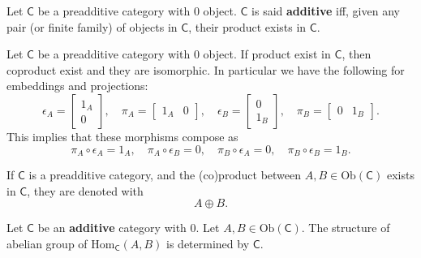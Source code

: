 \begin{defn}
	Let $\mathsf{C}$ be a preadditive category with $0$ object.
	$\mathsf{C}$ is said \textbf{additive} iff, given any pair (or finite family) of objects in $\mathsf{C}$, their product exists in $\mathsf{C}$.
\end{defn}

\begin{prop}
	Let $\mathsf{C}$ be a preadditive category with $0$ object.
	If product exist in $\mathsf{C}$, then coproduct exist and they are isomorphic.
	In particular we have the following for embeddings and projections:
	\begin{equation}
	\epsilon_A = 
	\begin{bmatrix}
		1_A \\ 0
	\end{bmatrix}, \quad
	\pi_A = 
	\begin{bmatrix}
		1_A & 0
	\end{bmatrix}, \quad
	\epsilon_B = 
	\begin{bmatrix}
		0 \\ 1_B
	\end{bmatrix}, \quad
	\pi_B = 
	\begin{bmatrix}
		0 & 1_B
	\end{bmatrix}
	.\end{equation} 
	This implies that these morphisms compose as
	\begin{equation}
	\pi_A \circ \epsilon_A = 1_A, \quad
	\pi_A \circ \epsilon_B = 0, \quad
	\pi_B \circ \epsilon_A = 0, \quad
	\pi_B \circ \epsilon_B = 1_B
	.\end{equation} 
\end{prop} 

\begin{defn}
	If $\mathsf{C}$ is a preadditive category, and the (co)product between $A, B \in \mathrm{Ob} \left(\mathsf{C}\right)$ exists in $\mathsf{C}$, they are denoted with 
	\begin{equation}
	A \oplus B
	.\end{equation} 
\end{defn}

\begin{prop}
	Let $\mathsf{C}$ be an \textbf{additive} category with $0$.
	Let $A, B \in \mathrm{Ob} \left(\mathsf{C}\right)$.
	The structure of abelian group of $\mathrm{Hom}_{\mathsf{C}} \left( A, B \right)$ is determined by $\mathsf{C}$.
\end{prop} 


